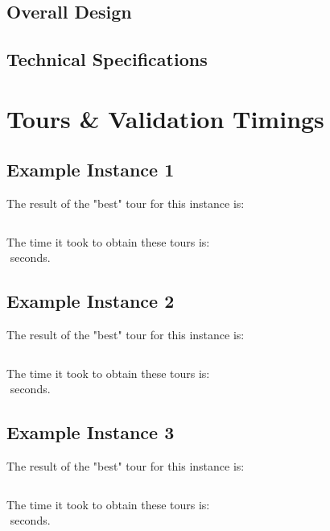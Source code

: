 \documentclass[11pt]{scrreprt}
\begin{document}
\section{Overall Design}

\section{Technical Specifications}

\chapter{Tours \& Validation Timings}
\section{Example Instance 1}

The result of the "best" tour for this instance is:\\

\begin{lstlisting}[basicstyle=\small,language=c]

\end{lstlisting}

The time it took to obtain these tours is:\\
$ $ seconds.

\section{Example Instance 2}

The result of the "best" tour for this instance is:\\

\begin{lstlisting}[basicstyle=\small,language=c]

\end{lstlisting}

The time it took to obtain these tours is:\\
$ $ seconds.

\section{Example Instance 3}

The result of the "best" tour for this instance is:\\

\begin{lstlisting}[basicstyle=\small,language=c]

\end{lstlisting}
The time it took to obtain these tours is:\\
$ $ seconds.
\end{document}
